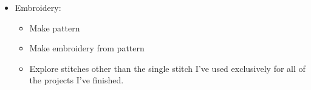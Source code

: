 \documentclass[12pt]{article}[titlepage]
\renewcommand{\,}{\textsuperscript{,}}
\begin{document}
\begin{itemize}
\begin{itemize}
\begin{itemize}
I should really start doing this again, and also on Sunday I lit a candle and it made my night better. If I do those together I think that it will be better for me.  
\item Find a way to add meta data to my blog posts and then add the meta data\footnote{at least moving forwards and hopefully also working backwards through the many posts that I have}  
\item Not only write blogs, but also post them.  
\item Get back into writing the web novel  
\item Write other fiction. Ideas include:  
\begin{itemize}  
\item The book I made a document about in late January  
\item A story told through bullet points  
\end{itemize}  
\end{itemize}   
\item Embroidery:  
\begin{itemize}  
\item Make pattern  
\item Make embroidery from pattern  
\item Explore stitches other than the single stitch I've used exclusively for all of the projects I've finished.  
\end{itemize}  
\end{itemize}   
\end{itemize}
\end{document}
